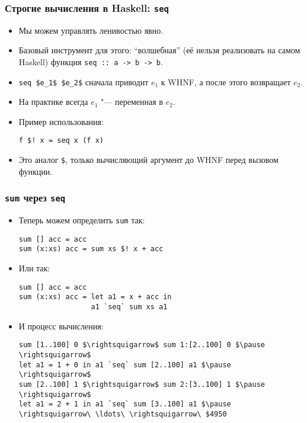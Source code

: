\documentclass[11pt]{beamer}
\begin{document}
\begin{frame}[fragile]
  \frametitle{Строгие вычисления в Haskell: \lstinline|seq|}
  \begin{itemize}
    \item Мы можем управлять ленивостью явно.
    \item Базовый инструмент для этого: \enquote{волшебная} (её нельзя реализовать на самом Haskell) функция \lstinline|seq :: a -> b -> b|.
          \pause
    \item \lstinline[mathescape]|seq $e_1$ $e_2$| сначала приводит $e_1$ к WHNF, а после этого возвращает $e_2$.
          \pause
    \item На практике всегда $e_1$ "--- переменная в $e_2$.
    \item Пример использования:
          \begin{lstlisting}[escapeinside=||]
f $! x = seq x (f x)
\end{lstlisting}
    \item Это аналог \lstinline|$|, только вычисляющий аргумент до WHNF перед вызовом функции.
  \end{itemize}
\end{frame}

\begin{frame}[fragile]
  \frametitle{\lstinline|sum| через \lstinline|seq|}
  \begin{itemize}
    \item Теперь можем определить \lstinline|sum| так:\pause
          \begin{lstlisting}[escapeinside=||]
sum [] acc = acc
sum (x:xs) acc = sum xs $! x + acc
\end{lstlisting}
    \item Или так:\pause
          \begin{lstlisting}
sum [] acc = acc
sum (x:xs) acc = let a1 = x + acc in 
                 a1 `seq` sum xs a1
\end{lstlisting}
    \item И процесс вычисления:
          \begin{lstlisting}[basicstyle=\ttfamily\small,mathescape]
sum [1..100] 0 $\rightsquigarrow$ sum 1:[2..100] 0 $\pause \rightsquigarrow$
let a1 = 1 + 0 in a1 `seq` sum [2..100] a1 $\pause \rightsquigarrow$
sum [2..100] 1 $\rightsquigarrow$ sum 2:[3..100] 1 $\pause \rightsquigarrow$ 
let a1 = 2 + 1 in a1 `seq` sum [3..100] a1 $\pause \rightsquigarrow\ \ldots\ \rightsquigarrow\ $4950
\end{lstlisting}
  \end{itemize}
\end{frame}
\end{document}
